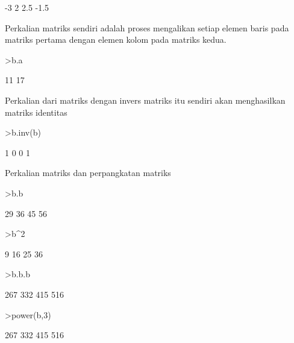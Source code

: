 \documentclass[a4paper,10pt]{article}
\begin{document}
\begin{eulernotebook}
\begin{eulercomment}
\begin{eulercomment}
\begin{eulercomment}
\begin{eulercomment}
\begin{euleroutput}
             -3             2 
            2.5          -1.5 
\end{euleroutput}
\begin{eulercomment}
Perkalian matriks sendiri adalah proses mengalikan setiap elemen baris
pada matriks pertama dengan elemen kolom pada matriks kedua.
\end{eulercomment}
\begin{eulerprompt}
>b.a
\end{eulerprompt}
\begin{euleroutput}
             11 
             17 
\end{euleroutput}
\begin{eulercomment}
Perkalian dari matriks dengan invers matriks itu sendiri akan
menghasilkan matriks identitas
\end{eulercomment}
\begin{eulerprompt}
>b.inv(b)
\end{eulerprompt}
\begin{euleroutput}
              1             0 
              0             1 
\end{euleroutput}
\begin{eulercomment}
Perkalian matriks dan perpangkatan matriks
\end{eulercomment}
\begin{eulerprompt}
>b.b
\end{eulerprompt}
\begin{euleroutput}
             29            36 
             45            56 
\end{euleroutput}
\begin{eulerprompt}
>b^2
\end{eulerprompt}
\begin{euleroutput}
              9            16 
             25            36 
\end{euleroutput}
\begin{eulerprompt}
>b.b.b
\end{eulerprompt}
\begin{euleroutput}
            267           332 
            415           516 
\end{euleroutput}
\begin{eulerprompt}
>power(b,3)
\end{eulerprompt}
\begin{euleroutput}
            267           332 
            415           516 
\end{euleroutput}
\begin{eulercomment}

\end{eulercomment}
\end{eulercomment}
\end{eulercomment}
\end{eulercomment}
\end{eulercomment}
\end{eulernotebook}
\end{document}
